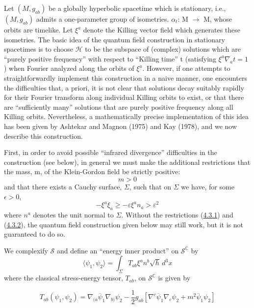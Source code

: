 \documentclass[11pt,a4paper]{article}
\begin{document}
Let \((M,g_{ab})\) be a globally hyperbolic spacetime which is stationary, i.e., \((M,g_{ab})\) admits a one-parameter group of isometries. \(\alpha_t\): M \(\rightarrow\) M, whose orbits are timelike. Let \(\xi^a\) denote the Killing vector field which generates these isometries. The basic idea of the quantum field construction in stationary spacetimes is to choose \(\mathcal{H}\) to be the subspace of (complex) solutions which are ``purely positive frequency'' with respect to ``Killing time'' t (satisfying \(\xi^a \nabla_a t = 1\) ) when Fourier analyzed along the orbits of \(\xi^a\). However, if one attempts to straightforwardly implement this construction in a naive manner, one encounters the difficulties that, a priori, it is not clear that solutions decay suitably rapidly for their Fourier transform along individual Killing orbits to exist, or that there are ``sufficiently many'' solutions that are purely positive frequency along all Killing orbits. Nevertheless, a mathematically precise implementation of this idea has been given by Ashtekar and Magnon (1975) and Kay (1978), and we now describe this construction.

First, in order to avoid possible ``infrared divergence'' difficulties in the construction (see below), in general we must make the additional restrictions that the mass, m, of the Klein-Gordon field be strictly positive:
\begin{equation*}
m > 0 \tag{4.3.1}\label{eq:4.3.1}
\end{equation*}
and that there exists a Cauchy surface, \(\Sigma\), such that on \(\Sigma\) we have, for some \(\epsilon > 0\),
\begin{equation*}
-\xi^a \xi_a \ge -\varepsilon \xi^a n_a > \varepsilon^2 \tag{4.3.2}\label{eq:4.3.2}
\end{equation*}
where \(n^a\) denotes the unit normal to \(\Sigma\). Without the restrictions (\hyperref[eq:4.3.1]{4.3.1}) and (\hyperref[eq:4.3.2]{4.3.2}), the quantum field construction given below may still work, but it is not guaranteed to do so.

We complexify \({\mathcal S}\) and define an ``energy inner product'' on \({\mathcal S}^{ {\mathbb C}}\) by
\begin{equation*}
\langle\psi_1,\psi_2\rangle=\int_\Sigma T_{ab} \xi^a n^b\sqrt h\,d^3x \tag{4.3.3}\label{eq:4.3.3}
\end{equation*}
where the classical stress-energy tensor, \(T_{ab}\), on \(\mathcal{S}^{ \mathbb{C}}\) is given by

\hypertarget{source-75}{}
\begin{equation*}
T_{ab}(\psi_1, \psi_2) = \nabla_{(a}\overline{\psi}_1\nabla_{b)}\psi_2 - \frac{1}{2}g_{ab}[\nabla^c\overline{\psi}_1\nabla_c\psi_2 + m^2\overline{\psi}_1\psi_2] \tag{4.3.4}\label{eq:4.3.4}
\end{equation*}
\end{document}
